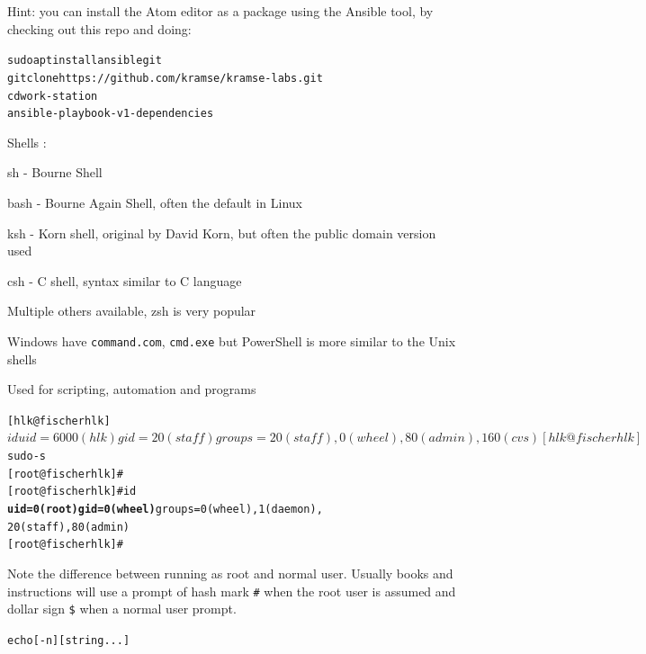 \documentclass[Screen16to9,17pt]{foils}
\begin{document}
Hint: you can install the Atom editor as a package using the Ansible tool, by checking out this repo and doing:
\begin{alltt}
sudo apt install ansible git
git clone https://github.com/kramse/kramse-labs.git
cd work-station
ansible-playbook -v 1-dependencies
\end{alltt}






\begin{list1}
\item Shells :
  \begin{list2}
    \item sh - Bourne Shell
\item bash - Bourne Again Shell, often the default in Linux
\item ksh - Korn shell, original by David Korn, but often the public domain version used
\item csh - C shell, syntax similar to C language
\item Multiple others available, zsh is very popular
  \end{list2}
\item Windows have \verb+command.com+, \verb+cmd.exe+ but PowerShell is more similar to the Unix shells
\item Used for scripting, automation and programs
\end{list1}





\begin{alltt}
\small
[hlk@fischer hlk]$ id
uid=6000(hlk) gid=20(staff) groups=20(staff),
0(wheel), 80(admin), 160(cvs)
[hlk@fischer hlk]$ sudo -s
[root@fischer hlk]#
[root@fischer hlk]# id {\bf
uid=0(root) gid=0(wheel)} groups=0(wheel), 1(daemon),
20(staff), 80(admin)
[root@fischer hlk]#
\end{alltt}

Note the difference between running as root and normal user. Usually books and instructions will use a prompt of hash mark \verb+#+ when the root user is assumed and dollar sign \verb+$+ when a normal user prompt.



\begin{alltt}
echo [-n] [string ...]
\end{alltt}
\end{document}
